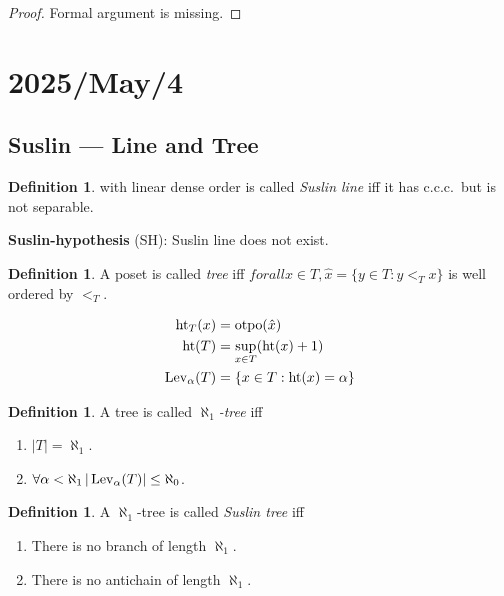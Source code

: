 \documentclass[11pt,pdftex,twoside,a4paper]{article}
\newcommand{\B}[1]{\textbf{#1}}
\newcommand{\ccc}{c.c.c.}
\newcommand{\Lev}{\ensuremath{\mathop{\rm Lev}\nolimits}}
\newcommand{\otp}{\ensuremath{\mathop{\rm otpo}\nolimits}}
\newcommand{\tht}{\ensuremath{\mathop{\rm ht}\nolimits}}
\theoremstyle{definition}
\newtheorem{ldef}[thm]{Definition}
\begin{document}
{\begin{proof}
Formal argument is missing.
\end{proof}


\section{2025/May/4}

\subsection{Suslin --- Line and Tree}

\begin{ldef}
 with linear dense order is called
\emph{Suslin line} iff it has \ccc\ but is not separable.
\end{ldef}

\B{Suslin-hypothesis} (SH): Suslin line does not exist.

\begin{ldef}
A poset  is called
\emph{tree} iff 
\(forall x\in T, \hat{x} = \{y\in T: y <_T x\}\) is well ordered by \(<_T\).
\end{ldef}
\vspace{-20pt}
\begin{align*}
 \tht_T(x) &= \otp(\hat{x}) \\
 \tht(T) &= \sup_{x\in T} (\tht(x)+1) \\
  \Lev_\alpha(T) &= \{x\in T: \tht(x)=\alpha\}
\end{align*}

\begin{ldef}
A tree  is called \emph{\(\aleph_1\)-tree} iff
\begin{enumerate}
\item \(|T| = \aleph_1\).
\item \(\forall\alpha<\aleph_1\, |\Lev_\alpha(T)|\leq\aleph_0\).
\end{enumerate}
\end{ldef}

\begin{ldef}
A \(\aleph_1\)-tree  is called 
\emph{Suslin tree} iff
\begin{enumerate}
\item There is no branch of length \(\aleph_1\).
\item There is no antichain of length \(\aleph_1\).
\end{enumerate}
\end{ldef}

}
\end{document}

